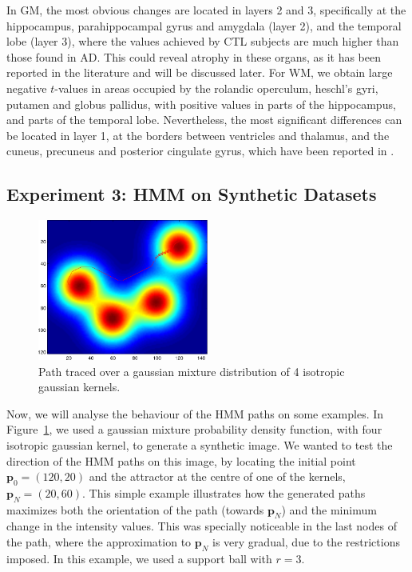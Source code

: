In \ac{GM}, the most obvious changes are located in layers 2 and 3, specifically at the hippocampus, parahippocampal gyrus and amygdala (layer 2), and the temporal lobe (layer 3), where the values achieved by \ac{CTL} subjects are much higher than those found in \ac{AD}. This could reveal atrophy in these organs, as it has been reported in the literature \cite{Dubois2007,Pievani2013} and will be discussed later. For \ac{WM}, we obtain large negative $t$-values in areas occupied by the rolandic operculum, heschl's gyri, putamen and globus pallidus, with positive values in parts of the hippocampus, and parts of the temporal lobe. Nevertheless, the most significant differences can be located in layer 1, at the borders between ventricles and thalamus, and the cuneus, precuneus and posterior cingulate gyrus, which have been reported in \cite{Baron2001}.

\subsection{Experiment 3: \acs{HMM} on Synthetic Datasets}

\begin{figure}
	\begin{center}
		\includegraphics[width=0.5\textwidth]{Graphics/ch6/gaussian}
		\caption{Path traced over a gaussian mixture distribution of 4 i\-so\-tro\-pic gaussian kernels.}
		\label{fig:gaussian}
	\end{center}
\end{figure}

Now, we will analyse the behaviour of the \ac{HMM} paths on some examples. In Figure~\ref{fig:gaussian}, we used a gaussian mixture probability density function, with four isotropic gaussian kernel, to generate a synthetic image. We wanted to test the direction of the \ac{HMM} paths on this image, by locating the initial point $\mathbf{p}_0 = (120,20)$ and the attractor at the centre of one of the kernels, $\mathbf{p}_N = (20, 60)$. This simple example illustrates how the generated paths maximizes both the orientation of the path (towards $\mathbf{p}_N$) and the minimum change in the intensity values. This was specially noticeable in the last nodes of the path, where the approximation to $\mathbf{p}_N$ is very gradual, due to the restrictions imposed. In this example, we used a support ball with $r=3$.


